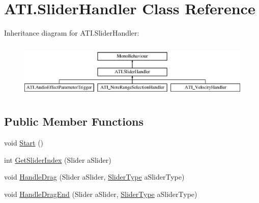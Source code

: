 \hypertarget{class_a_t_i_1_1_slider_handler}{}\section{A\+T\+I.\+Slider\+Handler Class Reference}
\label{class_a_t_i_1_1_slider_handler}
Inheritance diagram for A\+T\+I.\+Slider\+Handler\+:\begin{figure}[H]
\begin{center}
\leavevmode
\includegraphics[height=2.692308cm]{class_a_t_i_1_1_slider_handler}
\end{center}
\end{figure}
\subsection*{Public Member Functions}
\begin{DoxyCompactItemize}
\item 
void \hyperlink{class_a_t_i_1_1_slider_handler_ad7cd02a45170b1a4af432d1ccc2490ea}{Start} ()
\item 
int \hyperlink{class_a_t_i_1_1_slider_handler_ab6c7a9d82c98d87ebbe45c8a032dbd29}{Get\+Slider\+Index} (Slider a\+Slider)
\item 
void \hyperlink{class_a_t_i_1_1_slider_handler_a0ef4eeb2a91b744eaaf2453856aded60}{Handle\+Drag} (Slider a\+Slider, \hyperlink{class_a_t_i_ac4c6056a99cbd16ff0d292d33b038b9b}{Slider\+Type} a\+Slider\+Type)
\item 
void \hyperlink{class_a_t_i_1_1_slider_handler_ada65f41ef84f50737cece7be16c548f9}{Handle\+Drag\+End} (Slider a\+Slider, \hyperlink{class_a_t_i_ac4c6056a99cbd16ff0d292d33b038b9b}{Slider\+Type} a\+Slider\+Type)
\end{DoxyCompactItemize}
